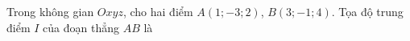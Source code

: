 \begin{ex}
Trong không gian $Oxyz$, cho hai điểm $A(1;-3;2)$, $B(3;-1;4)$. Tọa độ trung điểm $I$ của đoạn thẳng $AB$ là
\end{ex}
